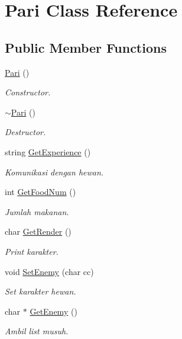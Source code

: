 \hypertarget{class_pari}{}\section{Pari Class Reference}
\label{class_pari}
\subsection*{Public Member Functions}
\begin{DoxyCompactItemize}
\item 
\hyperlink{class_pari_a5a119732b193e06037a00456c6606c35}{Pari} ()\hypertarget{class_pari_a5a119732b193e06037a00456c6606c35}{}\label{class_pari_a5a119732b193e06037a00456c6606c35}

\begin{DoxyCompactList}\small\item\em Constructor. \end{DoxyCompactList}\item 
\hyperlink{class_pari_a36087d3c1cef597ddbd54a735377e4cb}{$\sim$\+Pari} ()\hypertarget{class_pari_a36087d3c1cef597ddbd54a735377e4cb}{}\label{class_pari_a36087d3c1cef597ddbd54a735377e4cb}

\begin{DoxyCompactList}\small\item\em Destructor. \end{DoxyCompactList}\item 
string \hyperlink{class_pari_a4dc414c704021fe6bc46c7eaa7d916e7}{Get\+Experience} ()\hypertarget{class_pari_a4dc414c704021fe6bc46c7eaa7d916e7}{}\label{class_pari_a4dc414c704021fe6bc46c7eaa7d916e7}

\begin{DoxyCompactList}\small\item\em Komunikasi dengan hewan. \end{DoxyCompactList}\item 
int \hyperlink{class_pari_abceafaa8a5780e93c62f9d7010cb71e6}{Get\+Food\+Num} ()
\begin{DoxyCompactList}\small\item\em Jumlah makanan. \end{DoxyCompactList}\item 
char \hyperlink{class_pari_a4c4a6399d001827a5f162ef7f61f7adc}{Get\+Render} ()
\begin{DoxyCompactList}\small\item\em Print karakter. \end{DoxyCompactList}\item 
void \hyperlink{class_pari_a75009639d68712191acc97d3e2b085bd}{Set\+Enemy} (char cc)
\begin{DoxyCompactList}\small\item\em Set karakter hewan. \end{DoxyCompactList}\item 
char $\ast$ \hyperlink{class_pari_a0a925b9f16c081d70dd3fb9ed0083f8d}{Get\+Enemy} ()
\begin{DoxyCompactList}\small\item\em Ambil list musuh. \end{DoxyCompactList}\end{DoxyCompactItemize}
